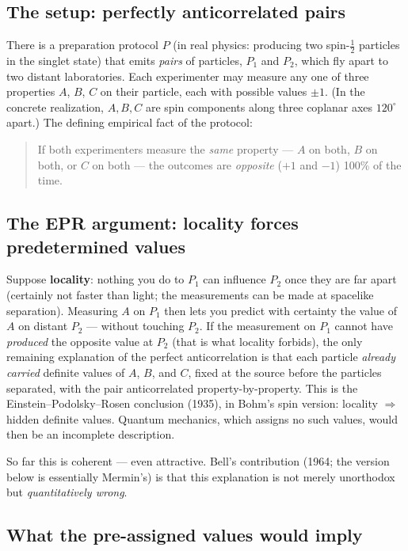 \documentclass[11pt,a4paper]{article}
\theoremstyle{remark}
\begin{document}
\subsection{The setup: perfectly anticorrelated pairs}

There is a preparation protocol $P$ (in real physics: producing two spin-$\tfrac12$
particles in the singlet state) that emits \emph{pairs} of particles, $P_1$ and
$P_2$, which fly apart to two distant laboratories. Each experimenter may measure
any one of three properties $A$, $B$, $C$ on their particle, each with possible
values $\pm1$. (In the concrete realization, $A,B,C$ are spin components along
three coplanar axes $120^\circ$ apart.) The defining empirical fact of the
protocol:
\begin{quote}
If both experimenters measure the \emph{same} property --- $A$ on both, $B$ on
both, or $C$ on both --- the outcomes are \emph{opposite} ($+1$ and $-1$)
100\% of the time.
\end{quote}

\subsection{The EPR argument: locality forces predetermined values}

Suppose \textbf{locality}: nothing you do to $P_1$ can influence $P_2$ once they
are far apart (certainly not faster than light; the measurements can be made at
spacelike separation). Measuring $A$ on $P_1$ then lets you predict with certainty
the value of $A$ on distant $P_2$ --- without touching $P_2$. If the measurement on
$P_1$ cannot have \emph{produced} the opposite value at $P_2$ (that is what
locality forbids), the only remaining explanation of the perfect anticorrelation
is that each particle \emph{already carried} definite values of $A$, $B$, and $C$,
fixed at the source before the particles separated, with the pair anticorrelated
property-by-property. This is the Einstein--Podolsky--Rosen conclusion (1935), in
Bohm's spin version: locality $\Rightarrow$ hidden definite values. Quantum
mechanics, which assigns no such values, would then be an incomplete description.

So far this is coherent --- even attractive. Bell's contribution (1964; the version
below is essentially Mermin's) is that this explanation is not merely
unorthodox but \emph{quantitatively wrong}.

\subsection{What the pre-assigned values would imply}
\end{document}

